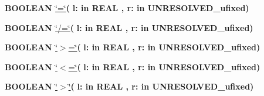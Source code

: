 \begin{DoxyCompactItemize}
\item 
{\bfseries {\bfseries \textcolor{comment}{B\+O\+O\+L\+E\+A\+N}\textcolor{vhdlchar}{ }}} \hyperlink{classfixed__pkg_a7949e9258ea0749e3b35961feea8db87}{\char`\"{}=\char`\"{}}{\bfseries  ( }{\bfseries \textcolor{vhdlchar}{l\+: }\textcolor{stringliteral}{in }{\bfseries \textcolor{comment}{R\+E\+A\+L}\textcolor{vhdlchar}{ }}}{\bfseries  , \textcolor{vhdlchar}{r\+: }\textcolor{stringliteral}{in }\textcolor{vhdlchar}{U\+N\+R\+E\+S\+O\+L\+V\+E\+D\+\_\+ufixed}}{\bfseries  )} 
\item 
{\bfseries {\bfseries \textcolor{comment}{B\+O\+O\+L\+E\+A\+N}\textcolor{vhdlchar}{ }}} \hyperlink{classfixed__pkg_a00087aded97b434060226b9ba63a9077}{\char`\"{}/=\char`\"{}}{\bfseries  ( }{\bfseries \textcolor{vhdlchar}{l\+: }\textcolor{stringliteral}{in }{\bfseries \textcolor{comment}{R\+E\+A\+L}\textcolor{vhdlchar}{ }}}{\bfseries  , \textcolor{vhdlchar}{r\+: }\textcolor{stringliteral}{in }\textcolor{vhdlchar}{U\+N\+R\+E\+S\+O\+L\+V\+E\+D\+\_\+ufixed}}{\bfseries  )} 
\item 
{\bfseries {\bfseries \textcolor{comment}{B\+O\+O\+L\+E\+A\+N}\textcolor{vhdlchar}{ }}} \hyperlink{classfixed__pkg_a4cd07e388cdbb3996dd11f56781d3758}{\char`\"{}$>$=\char`\"{}}{\bfseries  ( }{\bfseries \textcolor{vhdlchar}{l\+: }\textcolor{stringliteral}{in }{\bfseries \textcolor{comment}{R\+E\+A\+L}\textcolor{vhdlchar}{ }}}{\bfseries  , \textcolor{vhdlchar}{r\+: }\textcolor{stringliteral}{in }\textcolor{vhdlchar}{U\+N\+R\+E\+S\+O\+L\+V\+E\+D\+\_\+ufixed}}{\bfseries  )} 
\item 
{\bfseries {\bfseries \textcolor{comment}{B\+O\+O\+L\+E\+A\+N}\textcolor{vhdlchar}{ }}} \hyperlink{classfixed__pkg_a65b73a94d4fe541a941f431175b342b7}{\char`\"{}$<$=\char`\"{}}{\bfseries  ( }{\bfseries \textcolor{vhdlchar}{l\+: }\textcolor{stringliteral}{in }{\bfseries \textcolor{comment}{R\+E\+A\+L}\textcolor{vhdlchar}{ }}}{\bfseries  , \textcolor{vhdlchar}{r\+: }\textcolor{stringliteral}{in }\textcolor{vhdlchar}{U\+N\+R\+E\+S\+O\+L\+V\+E\+D\+\_\+ufixed}}{\bfseries  )} 
\item 
{\bfseries {\bfseries \textcolor{comment}{B\+O\+O\+L\+E\+A\+N}\textcolor{vhdlchar}{ }}} \hyperlink{classfixed__pkg_ac6c82329bf849852be997a3d0a737cf9}{\char`\"{}$>$\char`\"{}}{\bfseries  ( }{\bfseries \textcolor{vhdlchar}{l\+: }\textcolor{stringliteral}{in }{\bfseries \textcolor{comment}{R\+E\+A\+L}\textcolor{vhdlchar}{ }}}{\bfseries  , \textcolor{vhdlchar}{r\+: }\textcolor{stringliteral}{in }\textcolor{vhdlchar}{U\+N\+R\+E\+S\+O\+L\+V\+E\+D\+\_\+ufixed}}{\bfseries  )} 

\end{DoxyCompactItemize}
